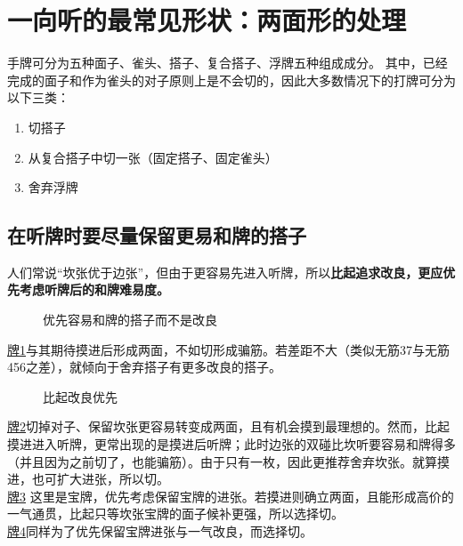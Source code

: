 \chapter[【一向听的技术】两面形的选择 其一]{一向听的最常见形状：两面形的处理}

手牌可分为五种面子、雀头、搭子、复合搭子、浮牌五种组成成分。
其中，已经完成的面子和作为雀头的对子原则上是不会切的，因此大多数情况下的打牌可分为以下三类：\begin{enumerate}
    \item 切搭子
    \item 从复合搭子中切一张（固定搭子、固定雀头）
    \item 舍弃浮牌
\end{enumerate}

\section{在听牌时要尽量保留更易和牌的搭子}
人们常说“坎张优于边张”，但由于更容易先进入听牌，所以\textbf{比起追求改良，更应优先考虑听牌后的和牌难易度。}

\begin{figure}[h]
    \caption{优先容易和牌的搭子而不是改良}
    \label{lec6:pai1}
\end{figure}

\hyperref[lec6:pai1]{牌1}与其期待摸进后形成两面，不如切形成骗筋。若差距不大（类似无筋37与无筋456之差），就倾向于舍弃搭子有更多改良的搭子。

\begin{figure}[h]
    \caption{比起改良优先}
    \label{lec6:pai2-4}
    \par\bigskip
    \par\bigskip
\end{figure}
\hyperref[lec6:pai2-4]{牌2}切掉对子、保留坎张更容易转变成两面，且有机会摸到最理想的。然而，比起摸进进入听牌，更常出现的是摸进后听牌；此时边张的双碰比坎听要容易和牌得多（并且因为之前切了，也能骗筋）。由于只有一枚，因此更推荐舍弃坎张。就算摸进，也可扩大进张，所以切。\\
\hyperref[lec6:pai2-4]{牌3}
这里是宝牌，优先考虑保留宝牌的进张。若摸进则确立两面，且能形成高价的一气通贯，比起只等坎张宝牌的面子候补更强，所以选择切。\\
\hyperref[lec6:pai2-4]{牌4}同样为了优先保留宝牌进张与一气改良，而选择切。

